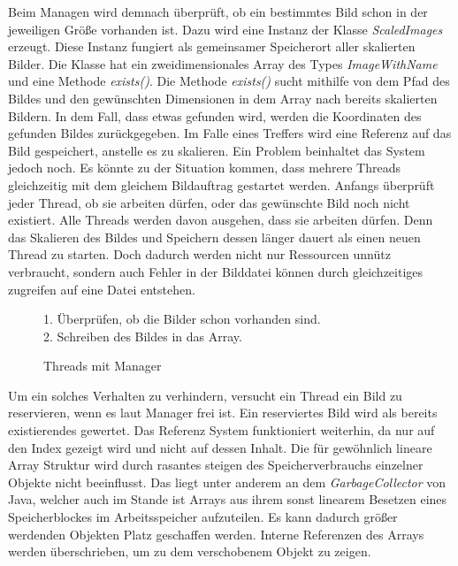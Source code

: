 Beim Managen wird demnach überprüft, ob ein bestimmtes Bild schon in der jeweiligen Größe vorhanden ist. Dazu wird eine Instanz der Klasse \textit{ScaledImages} erzeugt. Diese Instanz fungiert als gemeinsamer Speicherort aller skalierten Bilder. Die Klasse hat ein zweidimensionales Array des Types \textit{ImageWithName} und eine Methode \textit{exists()}. Die Methode \textit{exists()} sucht mithilfe von dem Pfad des Bildes und den gewünschten Dimensionen in dem Array nach bereits skalierten Bildern. In dem Fall, dass etwas gefunden wird, werden die Koordinaten des gefunden Bildes zurückgegeben. Im Falle eines Treffers wird eine Referenz auf das Bild gespeichert, anstelle es zu skalieren.
\medskip
\newline
Ein Problem beinhaltet das System jedoch noch. Es könnte zu der Situation kommen, dass mehrere Threads gleichzeitig mit dem gleichem Bildauftrag gestartet werden. Anfangs überprüft jeder Thread, ob sie arbeiten dürfen, oder das gewünschte Bild noch nicht existiert. Alle Threads werden davon ausgehen, dass sie arbeiten dürfen. Denn das Skalieren des Bildes und Speichern dessen länger dauert als einen neuen Thread zu starten. Doch dadurch werden nicht nur Ressourcen unnütz verbraucht, sondern auch Fehler in der Bilddatei können durch gleichzeitiges zugreifen auf eine Datei entstehen.

\begin{figure}[h]
    \centering
    \begin{minipage}{89mm}
        \fontsize{10pt}{11pt}\selectfont
        \def\svgwidth{8cm}
        
    \end{minipage}
    \begin{minipage}{1\textwidth-91mm}
        1. Überprüfen, ob die Bilder schon vorhanden sind.\\
        2. Schreiben des Bildes in das Array.
    \end{minipage}
    \caption[Thread und Manager]{Threads mit Manager}
\end{figure}

Um ein solches Verhalten zu verhindern, versucht ein Thread ein Bild zu reservieren, wenn es laut Manager frei ist. Ein reserviertes Bild wird als bereits existierendes gewertet. Das Referenz System funktioniert weiterhin, da nur auf den Index gezeigt wird und nicht auf dessen Inhalt. Die für gewöhnlich lineare Array Struktur wird durch rasantes steigen des Speicherverbrauchs einzelner Objekte nicht beeinflusst. Das liegt unter anderem an dem \textit{GarbageCollector} von Java, welcher auch im Stande ist Arrays aus ihrem sonst linearem Besetzen eines Speicherblockes im Arbeitsspeicher aufzuteilen. Es kann dadurch  größer werdenden Objekten Platz geschaffen werden. Interne Referenzen des Arrays werden überschrieben, um zu dem verschobenem Objekt zu zeigen.

